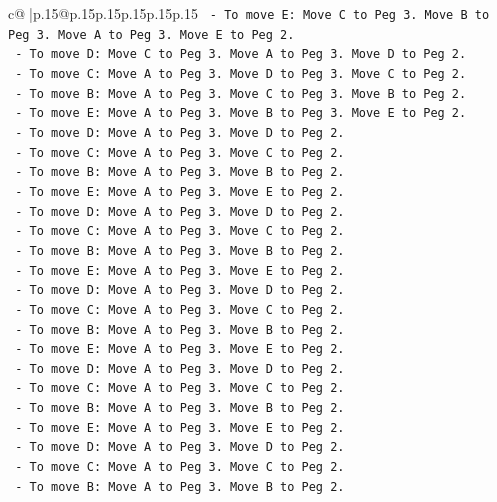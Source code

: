 \documentclass{article}
\begin{document}
{\begin{supertabular}{c@{$\;$}|p{.15\linewidth}@{}p{.15\linewidth}p{.15\linewidth}p{.15\linewidth}p{.15\linewidth}p{.15\linewidth}}
{{{\texttt{    {-}   To move E: Move C to Peg 3. Move B to Peg 3. Move A to Peg 3. Move E to Peg 2.} \\
\texttt{    {-}   To move D: Move C to Peg 3. Move A to Peg 3. Move D to Peg 2.} \\
\texttt{    {-}   To move C: Move A to Peg 3. Move D to Peg 3. Move C to Peg 2.} \\
\texttt{    {-}   To move B: Move A to Peg 3. Move C to Peg 3. Move B to Peg 2.} \\
\texttt{    {-}   To move E: Move A to Peg 3. Move B to Peg 3. Move E to Peg 2.} \\
\texttt{    {-}   To move D: Move A to Peg 3. Move D to Peg 2.} \\
\texttt{    {-}   To move C: Move A to Peg 3. Move C to Peg 2.} \\
\texttt{    {-}   To move B: Move A to Peg 3. Move B to Peg 2.} \\
\texttt{    {-}   To move E: Move A to Peg 3. Move E to Peg 2.} \\
\texttt{    {-}   To move D: Move A to Peg 3. Move D to Peg 2.} \\
\texttt{    {-}   To move C: Move A to Peg 3. Move C to Peg 2.} \\
\texttt{    {-}   To move B: Move A to Peg 3. Move B to Peg 2.} \\
\texttt{    {-}   To move E: Move A to Peg 3. Move E to Peg 2.} \\
\texttt{    {-}   To move D: Move A to Peg 3. Move D to Peg 2.} \\
\texttt{    {-}   To move C: Move A to Peg 3. Move C to Peg 2.} \\
\texttt{    {-}   To move B: Move A to Peg 3. Move B to Peg 2.} \\
\texttt{    {-}   To move E: Move A to Peg 3. Move E to Peg 2.} \\
\texttt{    {-}   To move D: Move A to Peg 3. Move D to Peg 2.} \\
\texttt{    {-}   To move C: Move A to Peg 3. Move C to Peg 2.} \\
\texttt{    {-}   To move B: Move A to Peg 3. Move B to Peg 2.} \\
\texttt{    {-}   To move E: Move A to Peg 3. Move E to Peg 2.} \\
\texttt{    {-}   To move D: Move A to Peg 3. Move D to Peg 2.} \\
\texttt{    {-}   To move C: Move A to Peg 3. Move C to Peg 2.} \\
\texttt{    {-}   To move B: Move A to Peg 3. Move B to Peg 2.} \\
}}}
\end{supertabular}}
\end{document}
